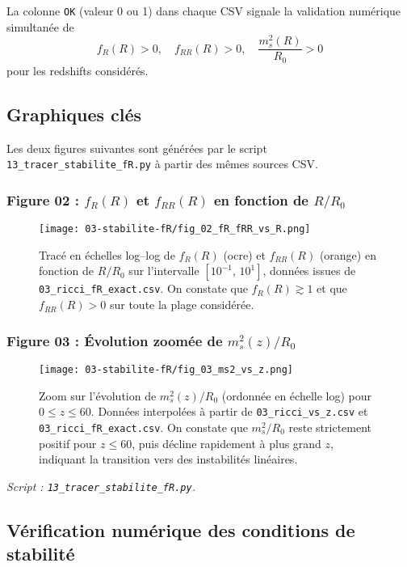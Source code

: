 La colonne \texttt{OK} (valeur 0 ou 1) dans chaque CSV signale la validation numérique simultanée de
\[
  f_{R}(R)>0,\quad f_{RR}(R)>0,\quad \frac{m_{s}^{2}(R)}{R_{0}}>0
\]
pour les redshifts considérés.

\subsection{Graphiques clés}

Les deux figures suivantes sont générées par le script \texttt{13\_tracer\_stabilite\_fR.py}
à partir des mêmes sources CSV.

\subsubsection*{Figure 02 : $f_{R}(R)$ et $f_{RR}(R)$ en fonction de $R/R_{0}$}

\begin{figure}[htbp]
  \centering
  \texttt{[image: 03-stabilite-fR/fig\_02\_fR\_fRR\_vs\_R.png]}
  \caption{Tracé en échelles log–log de $f_{R}(R)$ (ocre) et $f_{RR}(R)$ (orange)
    en fonction de $R/R_{0}$ sur l’intervalle $[10^{-1},\,10^{1}]$, données issues de \texttt{03\_ricci\_fR\_exact.csv}.
    On constate que $f_{R}(R)\gtrsim1$ et que $f_{RR}(R)>0$ sur toute la plage considérée.}
  \label{fig:fR_fRR_vs_R}
\end{figure}

\subsubsection*{Figure 03 : Évolution zoomée de $m_{s}^{2}(z)/R_{0}$}

\begin{figure}[htbp]
  \centering
  \texttt{[image: 03-stabilite-fR/fig\_03\_ms2\_vs\_z.png]}
  \caption{Zoom sur l’évolution de $m_{s}^{2}(z)/R_{0}$ (ordonnée en échelle log)
    pour $0\le z\le60$. Données interpolées à partir de \texttt{03\_ricci\_vs\_z.csv}
    et \texttt{03\_ricci\_fR\_exact.csv}. On constate que $m_{s}^{2}/R_{0}$
    reste strictement positif pour $z\le60$, puis décline rapidement à plus grand $z$,
    indiquant la transition vers des instabilités linéaires.}
  \label{fig:ms2_vs_z}
\end{figure}

\noindent\emph{Script : \texttt{13\_tracer\_stabilite\_fR.py}.}

\subsection{Vérification numérique des conditions de stabilité}

